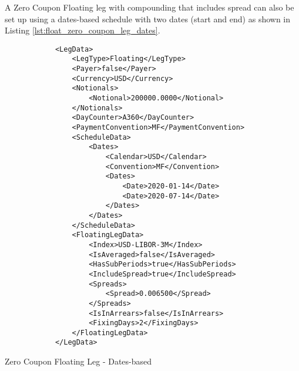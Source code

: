 \begin{itemize}
A Zero Coupon Floating leg with compounding that includes spread can also be set up using a dates-based schedule with two dates (start and end) as shown
in Listing \ref{lst:float_zero_coupon_leg_dates}. \begin{listing}[H]
\begin{verbatim}
            <LegData>
                <LegType>Floating</LegType>
                <Payer>false</Payer>
                <Currency>USD</Currency>
                <Notionals>
                    <Notional>200000.0000</Notional>
                </Notionals>
                <DayCounter>A360</DayCounter>
                <PaymentConvention>MF</PaymentConvention>
                <ScheduleData>
                    <Dates>
                        <Calendar>USD</Calendar>
                        <Convention>MF</Convention>
                        <Dates>
                            <Date>2020-01-14</Date>
                            <Date>2020-07-14</Date>
                        </Dates>
                    </Dates>
                </ScheduleData>
                <FloatingLegData>
                    <Index>USD-LIBOR-3M</Index>
                    <IsAveraged>false</IsAveraged>
                    <HasSubPeriods>true</HasSubPeriods>
                    <IncludeSpread>true</IncludeSpread>
                    <Spreads>
                        <Spread>0.006500</Spread>
                    </Spreads>
                    <IsInArrears>false</IsInArrears>
                    <FixingDays>2</FixingDays>
                </FloatingLegData>
            </LegData>
\end{verbatim}
\caption{Zero Coupon Floating Leg - Dates-based}
\label{lst:float_zero_coupon_leg_dates}
\end{listing}


\end{itemize}
